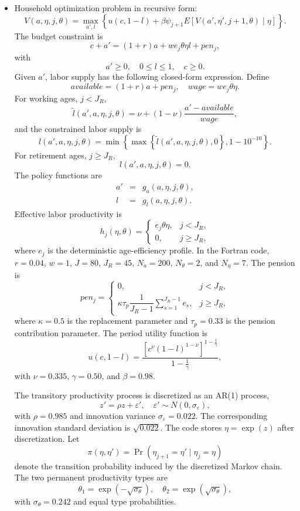 \documentclass[11pt]{article}
\begin{document}
\begin{itemize}
\item Household optimization problem in recursive form:
\[
V(a,\eta,j,\theta)
=\max_{a',l}\left\{
u(c,1-l)+\beta\psi_{j+1}E\left[
V(a',\eta',j+1,\theta)\mid\eta\right]\right\}.
\]
The budget constraint is
\[
c+a'=(1+r)a+w e_j\theta\eta l+pen_j,
\]
with
\[
a'\geq 0,\quad 0\leq l\leq 1,\quad c\geq 0.
\]
Given $a'$, labor supply has the following closed-form expression. Define
\[
available=(1+r)a+pen_j,\quad wage=w e_j\theta\eta.
\]
For working ages, $j<J_R$,
\[
\tilde l(a',a,\eta,j,\theta)
=\nu +(1-\nu)\frac{a'-available}{wage},
\]
and the constrained labor supply is
\[
l(a',a,\eta,j,\theta)
=\min\left\{\max\left\{\tilde l(a',a,\eta,j,\theta),0\right\},
1-10^{-10}\right\}.
\]
For retirement ages, $j\geq J_R$,
\[
l(a',a,\eta,j,\theta)=0.
\]
The policy functions are
\begin{eqnarray*}
a' &=& g_a(a,\eta,j,\theta),\\
l  &=& g_l(a,\eta,j,\theta).
\end{eqnarray*}
Effective labor productivity is
\[
h_j(\eta,\theta)=
\begin{cases}
e_j\theta\eta, & j<J_R,\\
0, & j\geq J_R,
\end{cases}
\]
where $e_j$ is the deterministic age-efficiency profile. In the Fortran
code, $r=0.04$, $w=1$, $J=80$, $J_R=45$, $N_a=200$, $N_\theta=2$, and
$N_\eta=7$. The pension is
\[
pen_j=
\begin{cases}
0, & j<J_R,\\
\kappa \tau_p \dfrac{1}{J_R-1}\sum_{s=1}^{J_R-1} e_s, & j\geq J_R,
\end{cases}
\]
where $\kappa=0.5$ is the replacement parameter and $\tau_p=0.33$ is the
pension contribution parameter.
The period utility function is
\[
u(c,1-l)=
\frac{\left[c^\nu(1-l)^{1-\nu}\right]^{1-\frac{1}{\gamma}}}
{1-\frac{1}{\gamma}},
\]
with $\nu=0.335$, $\gamma=0.50$, and $\beta=0.98$.

The transitory productivity process is discretized as an AR(1) process,
\[
z'=\rho z+\varepsilon',\quad
\varepsilon'\sim N(0,\sigma_\varepsilon),
\]
with $\rho=0.985$ and innovation variance $\sigma_\varepsilon=0.022$.
The corresponding innovation standard deviation is $\sqrt{0.022}$. The code
stores $\eta=\exp(z)$ after discretization. Let
\[
\pi(\eta,\eta')=\Pr(\eta_{j+1}=\eta'\mid \eta_j=\eta)
\]
denote the transition probability induced by the discretized Markov chain.
The two permanent productivity types are
\[
\theta_1=\exp(-\sqrt{\sigma_\theta}),\quad
\theta_2=\exp(\sqrt{\sigma_\theta}),
\]
with $\sigma_\theta=0.242$ and equal type probabilities.


\end{itemize}
\end{document}
